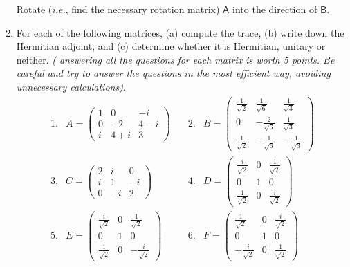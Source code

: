 \documentclass[fleqn]{article}
\begin{document}
\begin{enumerate}
  Rotate ({\it i.e.}, find the necessary rotation matrix) $\mathsf{A}$ into the direction of $\mathsf{B}$.


  \item  For each of the following matrices, (a) compute the trace, (b) write down the Hermitian adjoint, and (c) determine whether it is Hermitian, unitary or neither. \emph{( answering all the questions for each matrix is worth 5 points. Be careful and try to answer the questions in the most efficient way, avoiding unnecessary calculations)}. 
    \[
    \begin{array}{ccccc}
    1. & A=\left( 
    \begin{array}{ccc}
    1 & 0 & -i \\ 
    0 & -2 & 4-i \\ 
    i & 4+i & 3
    \end{array}
    \right)  & \, & 2. & B=\left( 
    \begin{array}{ccc}
    \frac{1}{\sqrt{2}} & \frac{1}{\sqrt{6}} & \frac{1}{\sqrt{3}} \\ 
    0 & -\frac{2}{\sqrt{6}} & \frac{1}{\sqrt{3}} \\ 
    \frac{1}{\sqrt{2}} & -\frac{1}{\sqrt{6}} & -\frac{1}{\sqrt{3}}
    \end{array}
    \right)  \\ 
    3. & C=\left( 
    \begin{array}{lll}
    2 & i & 0 \\ 
    i & 1 & -i \\ 
    0 & -i & 2
    \end{array}
    \right)  & \, & 4. & D=\left( 
    \begin{array}{ccc}
    \frac{i}{\sqrt{2}} & 0 & \frac{1}{\sqrt{2}} \\ 
    0 & 1 & 0 \\ 
    \frac{1}{\sqrt{2}} & 0 & \frac{i}{\sqrt{2}}
    \end{array}
    \right)  \\ 
    5. & E=\left( 
    \begin{array}{ccc}
    \frac{i}{\sqrt{2}} & 0 & \frac{1}{\sqrt{2}} \\ 
    0 & 1 & 0 \\ 
    \frac{1}{\sqrt{2}} & 0 & -\frac{i}{\sqrt{2}}
    \end{array}
    \right)  & \, & 6. & F=\left( 
    \begin{array}{ccc}
    \frac{1}{\sqrt{2}} & 0 & \frac{i}{\sqrt{2}} \\ 
    0 & 1 & 0 \\ 
    -\frac{i}{\sqrt{2}} & 0 & \frac{1}{\sqrt{2}}
    \end{array}
    \right) 
    \end{array}
    \]


\end{enumerate}
\end{document}
